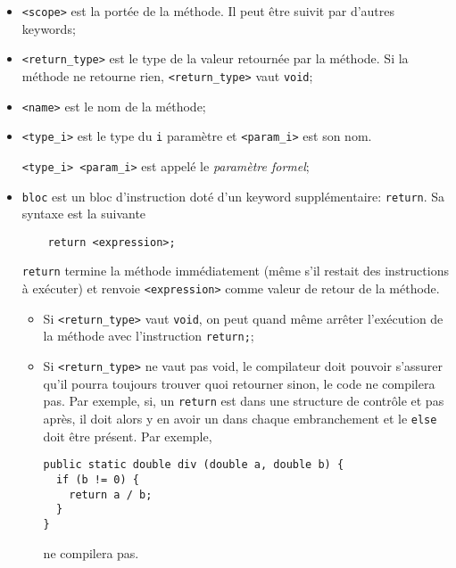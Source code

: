 \begin{itemize}
  \item \lstinline|<scope>| est la portée de la méthode. Il peut être
    suivit par d'autres keywords;
  \item \lstinline|<return_type>| est le type de la valeur retournée par
    la méthode.
    Si la méthode ne retourne rien,
    \lstinline|<return_type>| vaut \lstinline|void|;
  \item \lstinline|<name>| est le nom de la méthode;
  \item \lstinline|<type_i>| est le type du \lstinline|i|\ieme{} paramètre et
    \lstinline|<param_i>| est son nom.

    \lstinline|<type_i> <param_i>| est appelé le \emph{paramètre formel};
  \item \lstinline|bloc| est un bloc d'instruction doté
    d'un keyword supplémentaire:
    \lstinline|return|. Sa syntaxe est la suivante
    \begin{lstlisting}
    return <expression>;
    \end{lstlisting}
    \lstinline|return| termine la méthode immédiatement
    (même s'il restait des instructions à exécuter) et
    renvoie \lstinline|<expression>| comme valeur de retour de la méthode.
    \begin{itemize}
      \item
        Si \lstinline|<return_type>| vaut \lstinline|void|, on peut quand même
        arrêter l'exécution de la méthode avec l'instruction \lstinline|return;|;
      \item
        Si \lstinline|<return_type>| ne vaut pas void,
        le compilateur doit pouvoir s'assurer qu'il pourra toujours
        trouver quoi retourner sinon, le code ne compilera pas.
        Par exemple,
        si, un \lstinline|return| est dans une structure de contrôle
        et pas après, il doit alors y en avoir un dans chaque embranchement
        et le \lstinline|else| doit être présent.
        Par exemple,
        \begin{lstlisting}
public static double div (double a, double b) {
  if (b != 0) {
    return a / b;
  }
}
        \end{lstlisting}
        ne compilera pas.
    \end{itemize}
\end{itemize}

